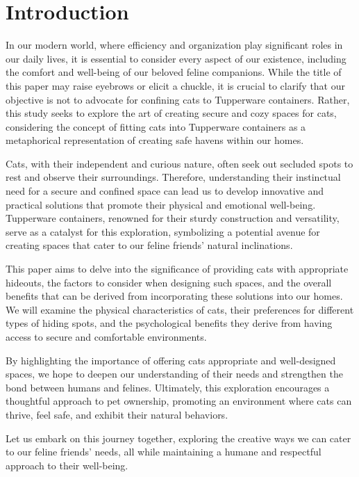 \section{Introduction}

In our modern world, where efficiency and organization play significant roles in our daily lives, it is essential to consider every aspect of our existence, including the comfort and well-being of our beloved feline companions. While the title of this paper may raise eyebrows or elicit a chuckle, it is crucial to clarify that our objective is not to advocate for confining cats to Tupperware containers. Rather, this study seeks to explore the art of creating secure and cozy spaces for cats, considering the concept of fitting cats into Tupperware containers as a metaphorical representation of creating safe havens within our homes.

Cats, with their independent and curious nature, often seek out secluded spots to rest and observe their surroundings. Therefore, understanding their instinctual need for a secure and confined space can lead us to develop innovative and practical solutions that promote their physical and emotional well-being. Tupperware containers, renowned for their sturdy construction and versatility, serve as a catalyst for this exploration, symbolizing a potential avenue for creating spaces that cater to our feline friends' natural inclinations.

This paper aims to delve into the significance of providing cats with appropriate hideouts, the factors to consider when designing such spaces, and the overall benefits that can be derived from incorporating these solutions into our homes. We will examine the physical characteristics of cats, their preferences for different types of hiding spots, and the psychological benefits they derive from having access to secure and comfortable environments.

By highlighting the importance of offering cats appropriate and well-designed spaces, we hope to deepen our understanding of their needs and strengthen the bond between humans and felines. Ultimately, this exploration encourages a thoughtful approach to pet ownership, promoting an environment where cats can thrive, feel safe, and exhibit their natural behaviors.

Let us embark on this journey together, exploring the creative ways we can cater to our feline friends' needs, all while maintaining a humane and respectful approach to their well-being.
